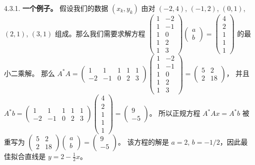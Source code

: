 4.3.1. \textbf{一个例子。} 假设我们的数据 $(x_k, y_k)$ 由对 $(−2, 4)$, $(−1, 2)$, $(0, 1)$, $(2, 1)$, $(3, 1)$ 组成。那么我们需要求解方程
$\begin{pmatrix} 1 & -2 \\ 1 & -1 \\ 1 & 0 \\ 1 & 2 \\ 1 & 3 \end{pmatrix} \begin{pmatrix} a \\ b \end{pmatrix} = \begin{pmatrix} 4 \\ 2 \\ 1 \\ 1 \\ 1 \end{pmatrix}$
的最小二乘解。
那么 $A^*A = \begin{pmatrix} 1 & 1 & 1 & 1 & 1 \\ -2 & -1 & 0 & 2 & 3 \end{pmatrix} \begin{pmatrix} 1 & -2 \\ 1 & -1 \\ 1 & 0 \\ 1 & 2 \\ 1 & 3 \end{pmatrix} = \begin{pmatrix} 5 & 2 \\ 2 & 18 \end{pmatrix}$，
并且 $A^*b = \begin{pmatrix} 1 & 1 & 1 & 1 & 1 \\ -2 & -1 & 0 & 2 & 3 \end{pmatrix} \begin{pmatrix} 4 \\ 2 \\ 1 \\ 1 \\ 1 \end{pmatrix} = \begin{pmatrix} 9 \\ -5 \end{pmatrix}$。
所以正规方程 $A^*Ax = A^*b$ 被重写为
$\begin{pmatrix} 5 & 2 \\ 2 & 18 \end{pmatrix} \begin{pmatrix} a \\ b \end{pmatrix} = \begin{pmatrix} 9 \\ -5 \end{pmatrix}$。
该方程的解是 $a = 2$, $b = -1/2$，因此最佳拟合直线是 $y = 2 - \frac{1}{2}x$。

